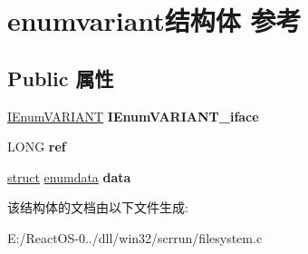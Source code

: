 \hypertarget{structenumvariant}{}\section{enumvariant结构体 参考}
\label{structenumvariant}
\subsection*{Public 属性}
\begin{DoxyCompactItemize}
\item 
\mbox{\label{structenumvariant_a17a9565b4611614beb06f9f41c67f1ca}} 
\hyperlink{interface_i_enum_v_a_r_i_a_n_t}{I\+Enum\+V\+A\+R\+I\+A\+NT} {\bfseries I\+Enum\+V\+A\+R\+I\+A\+N\+T\+\_\+iface}
\item 
\mbox{\label{structenumvariant_a77305c019de68020810ccfe9839d640b}} 
L\+O\+NG {\bfseries ref}
\item 
\mbox{\label{structenumvariant_a2ac836bc760a41ec0cb541180d7727d4}} 
\hyperlink{interfacestruct}{struct} \hyperlink{structenumdata}{enumdata} {\bfseries data}
\end{DoxyCompactItemize}


该结构体的文档由以下文件生成\+:\begin{DoxyCompactItemize}
\item 
E\+:/\+React\+O\+S-\/0../dll/win32/scrrun/filesystem.\+c\end{DoxyCompactItemize}
